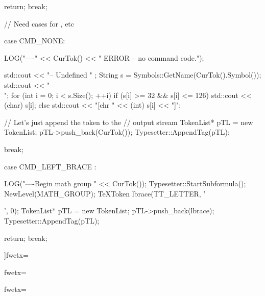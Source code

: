 {{{{{{{{{{{{{         return;
         break;

      // Need cases for \mathchar, etc

      case CMD_NONE:{
        LOG("\n----" << CurTok()
                     << " ERROR -- no command code.");

        std::cout << "\n-- Undefined " ;
        String s = Symbols::GetName(CurTok().Symbol());
        std::cout << "\\";
        for (int i = 0; i < s.Size(); ++i){
          if (s[i] >= 32 && s[i] <= 126){
             std::cout << (char) s[i];
          } else {
             std::cout << "[chr " << (int) s[i] << "]";
          }
        }

        // Let's just append the token to the
        // output stream
        TokenList* pTL = new TokenList;
        pTL->push_back(CurTok());
        Typesetter::AppendTag(pTL);

        break;
      }

      case CMD_LEFT_BRACE : {
         LOG("\n----Begin math group " << CurTok());
         Typesetter::StartSubformula();
         NewLevel(MATH_GROUP);
         TeXToken lbrace(TT_LETTER, '{', 0);
         TokenList* pTL = new TokenList;
         pTL->push_back(lbrace);
         Typesetter::AppendTag(pTL);

         return;
         break;
      }
   }
 }
}
]fwetx=%
\fwcdef 
\fwbeginmacronotes
{}
\fwendmacronotes
\fwendmacro



\fwbeginmacro
{}\fwplusequals \fwodef {}fwetx=%
\fwcdef 
\fwbeginmacronotes
{}
\fwendmacronotes
\fwendmacro


\fwbeginmacro
{}\fwplusequals \fwodef {}fwetx=%
\fwcdef 
\fwbeginmacronotes
{}
\fwendmacronotes
\fwendmacro










}}}}}}}}}}}
